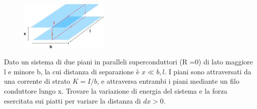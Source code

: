 \begin{figure} %
    \centering
    \includegraphics[width=0.38\textwidth]{images/superconducting_plane} %
\end{figure}
Dato un sistema di due piani in paralleli superconduttori (R =0) di lato maggiore l e minore b, la cui distanza di separazione \`e $x \ll b,l$. I piani sono attraversati da una corrente di strato $K = I/b$, e attraversa entrambi i piani mediante un filo conduttore lungo x. Trovare la variazione di energia del sistema e la forza esercitata sui piatti per variare la distanza di $dx > 0$.

